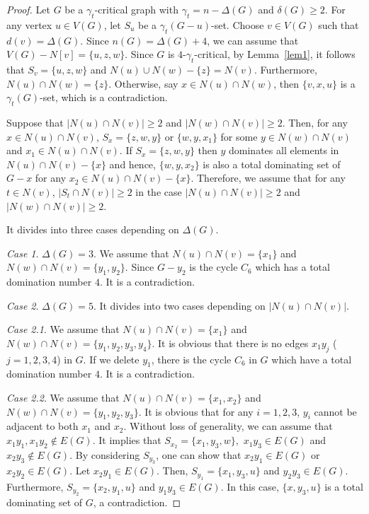 \documentclass[12pt]{amsart}
\begin{document}
\begin{proof} Let $G$ be a $\gamma_{t}$-critical graph with $\gamma_{t}= n- \Delta(G)$ and $\delta(G)\geq 2$.
For any vertex $u\in V(G)$, let $S_{u}$ be a $\gamma_{t}(G-u)$-set. Choose $v\in V(G)$ such that $d(v)=\Delta(G)$.
Since $n(G) =\Delta(G)+4$, we can assume that $V(G)-N[v]=\{u,z,w\}$.
Since $G$ is $4$-$\gamma_{t}$-critical, by Lemma~\ref{lem1}, it follows
that $S_{v}=\{u,z,w\}$ and $N(u)\cup N(w)-\{z\}=N(v).$
Furthermore, $N(u)\cap N(w)=\{z\}$. Otherwise, say $x\in
N(u)\cap N(w)$, then $\{v,x,u\}$ is a $\gamma_{t}(G)$-set, which is
a contradiction.

Suppose that  $|N(u)\cap N(v)| \ge 2$ and $|N(w)\cap N(v)| \ge 2$. Then, for any $x \in N(u)\cap N(v)$, $S_x =\{ z,w,y \}$ or $\{ w, y, x_1 \}$ for some $y\in N(w)\cap N(v)$ and $x_1 \in N(u)\cap N(v)$. If $S_x =\{ z,w,y \}$ then $y$ dominates all elements in $ N(u)\cap N(v) - \{ x \}$ and hence, $\{ w, y, x_2 \}$ is also a total dominating set of $G-x$ for any $x_2 \in N(u)\cap N(v) - \{ x \}$. Therefore, we assume that for any $t \in N(v)$, $|S_t \cap N(v)| \ge 2$ in the case $|N(u)\cap N(v)| \ge 2$ and $|N(w)\cap N(v)| \ge 2$.

It divides into three cases depending on $\Delta(G)$.

\noindent\emph{Case 1}. $\Delta(G)=3$.  We assume that $N(u)\cap N(v) = \{x_1\}$ and $N(w)\cap N(v) = \{y_1, y_2\}$.
Since $G-y_2$ is  the cycle $C_{6}$ which has a total domination number $4$. It is a contradiction.

\noindent\emph{Case 2}. $\Delta(G)=5$. It divides into two cases depending on $|N(u)\cap N(v)|$.

\noindent\emph{Case 2.1}. We assume that
$N(u)\cap N(v) = \{x_1\}$ and $N(w)\cap N(v) = \{y_1, y_2, y_3,y_4\}$. It is obvious that there is no edges $x_1y_j$ ($j = 1,2,3,4$) in $G$.
If we delete $y_1$, there is the cycle $C_{6}$ in $G$ which have a total domination number $4$. It is a contradiction.

\noindent\emph{Case 2.2}. We assume that $N(u)\cap N(v) = \{x_1, x_2\}$ and $N(w)\cap N(v) = \{y_1, y_2, y_3\}$.
It is obvious that for any $i=1,2,3$, $y_i$ cannot be adjacent to both $x_1$ and $x_2$.
Without loss of generality, we can assume that  $x_1y_1, x_1y_2 \notin E(G)$.
It implies that  $S_{x_{2}} = \{ x_1, y_3, w \},$  $x_1y_3 \in E(G)$ and $x_2y_3 \notin E(G)$. By considering $S_{y_3}$, one can show that $x_2y_1\in E(G)$ or $x_2y_2 \in E(G)$. Let $x_2y_1 \in E(G)$. Then, $S_{y_1}=\{ x_1, y_3, u \}$ and $y_2y_3 \in E(G)$. Furthermore, $S_{y_2} = \{ x_2, y_1, u \}$ and $y_1y_3 \in E(G)$. In this case, $\{ x, y_3, u \}$ is a total dominating set of $G$, a contradiction.


\end{proof}
\end{document}
